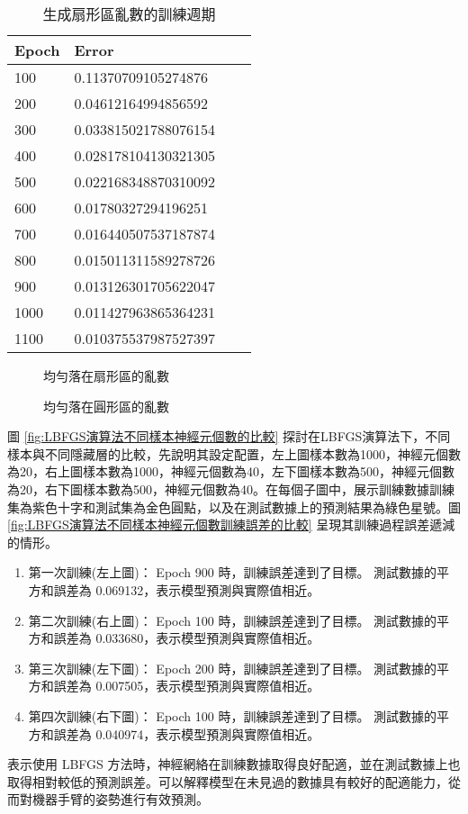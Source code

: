 \begin{table}[H]
\begin{center}
\caption{生成扇形區亂數的訓練週期}\label{tb:生成扇形區亂數的訓練週期}
\extrarowheight=4pt
\begin{tabular}{llll}
\rowcolor[gray]{.9}
Epoch	   &	 	Error\\
\toprule
100&0.11370709105274876\\
200&0.04612164994856592\\
300&0.033815021788076154\\
400&0.028178104130321305\\
500&0.022168348870310092\\
600&0.01780327294196251\\
700&0.016440507537187874\\
800&0.015011311589278726\\
900&0.013126301705622047\\
1000&0.011427963865364231\\
1100&0.010375537987527397\\
\bottomrule
\end{tabular}
\end{center}
\end{table}

\begin{figure}[H]
    \caption{均勻落在扇形區的亂數}
    \label{fig:均勻落在扇形區的亂數}
\end{figure}
\begin{figure}[H]
    \caption{均勻落在圓形區的亂數}
    \label{fig:均勻落在圓形區的亂數}
\end{figure}
圖 \ref{fig:LBFGS演算法不同樣本神經元個數的比較} 探討在LBFGS演算法下，不同樣本與不同隱藏層的比較，先說明其設定配置，左上圖樣本數為1000，神經元個數為20，右上圖樣本數為1000，神經元個數為40，左下圖樣本數為500，神經元個數為20，右下圖樣本數為500，神經元個數為40。在每個子圖中，展示訓練數據訓練集為紫色十字和測試集為金色圓點，以及在測試數據上的預測結果為綠色星號。圖 \ref{fig:LBFGS演算法不同樣本神經元個數訓練誤差的比較} 呈現其訓練過程誤差遞減的情形。
\begin{enumerate}
\item 第一次訓練(左上圖)：
Epoch 900 時，訓練誤差達到了目標。
測試數據的平方和誤差為 0.069132，表示模型預測與實際值相近。
\item 第二次訓練(右上圖)：
Epoch 100 時，訓練誤差達到了目標。
測試數據的平方和誤差為 0.033680，表示模型預測與實際值相近。
\item 第三次訓練(左下圖)：
Epoch 200 時，訓練誤差達到了目標。
測試數據的平方和誤差為 0.007505，表示模型預測與實際值相近。
\item 第四次訓練(右下圖)：
Epoch 100 時，訓練誤差達到了目標。
測試數據的平方和誤差為 0.040974，表示模型預測與實際值相近。
\end{enumerate}
表示使用 LBFGS 方法時，神經網絡在訓練數據取得良好配適，並在測試數據上也取得相對較低的預測誤差。可以解釋模型在未見過的數據具有較好的配適能力，從而對機器手臂的姿勢進行有效預測。

